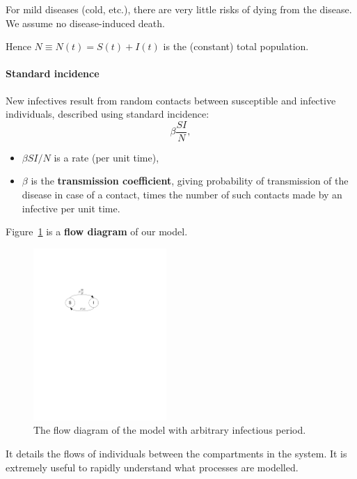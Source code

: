 For mild diseases (cold, etc.), there are very little risks of dying from the
disease. We assume no disease-induced death.

Hence $N\equiv N(t)=S(t)+I(t)$ is the (constant) total population.


\paragraph{Standard incidence}
New infectives result from random contacts between susceptible and infective individuals, described using standard incidence:
\[
\beta\frac{SI}{N},
\]
\begin{itemize}
\item $\beta SI/N$ is a rate (per unit time), 
\item $\beta$ is the \textbf{transmission coefficient}, giving probability of transmission of the disease in case of a
contact, times the number of such contacts made by an infective per
unit time.
\end{itemize}



Figure~\ref{fig:flow_diagram_SIS_P} is a \textbf{flow diagram} of our model.
\begin{figure}[htbp]
\begin{center} \includegraphics[width=0.45\textwidth]{../figs_03_residence_time/SIS_general}
\caption{The flow diagram of the model with arbitrary infectious period.}
\label{fig:flow_diagram_SIS_P}
\end{center}
\end{figure}
It details the flows of individuals between the compartments in the system.
It is extremely useful to rapidly understand what processes are modelled.


